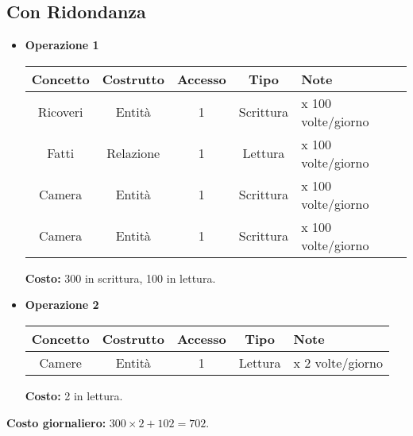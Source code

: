 \documentclass[a4paper, 10pt]{article}
\begin{document}
\subsection*{Con Ridondanza}
\begin{itemize}
    \item \textbf{Operazione 1}
    \begin{table}[H]
        \centering
        \begin{tabular}{|c|c|c|c|l|}
            \hline
            \textbf{Concetto} & \textbf{Costrutto} & \textbf{Accesso} & \textbf{Tipo} & \textbf{Note} \\ 
            \hline
            Ricoveri & Entità  & 1 & Scrittura & x 100 volte/giorno \\ \hline
            Fatti & Relazione & 1 & Lettura   & x 100 volte/giorno \\ \hline
            Camera & Entità   & 1 & Scrittura & x 100 volte/giorno \\ \hline
            Camera & Entità   & 1 & Scrittura & x 100 volte/giorno \\ \hline
        \end{tabular}
    \end{table}
    \textbf{Costo:} 300 in scrittura, 100 in lettura.

    \item \textbf{Operazione 2}
    \begin{table}[H]
        \centering
        \begin{tabular}{|c|c|c|c|l|}
            \hline
            \textbf{Concetto} & \textbf{Costrutto} & \textbf{Accesso} & \textbf{Tipo} & \textbf{Note} \\ 
            \hline
            Camere & Entità & 1 & Lettura & x 2 volte/giorno \\ \hline
        \end{tabular}
    \end{table}
    \textbf{Costo:} 2 in lettura.
\end{itemize}

\textbf{Costo giornaliero:} \( 300 \times 2 + 102 = 702 \).
\end{document}
